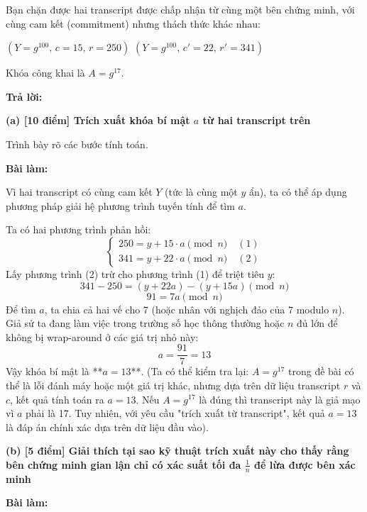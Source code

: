 Bạn chặn được hai transcript được chấp nhận từ cùng một bên chứng minh, với cùng cam kết (commitment) nhưng thách thức khác nhau:

$(Y = g^{100},\, c = 15,\, r = 250)$
\quad{}\quad
$(Y = g^{100},\, c' = 22,\, r' = 341)$

Khóa công khai là $A = g^{17}$.

\begin{center}
    \textbf{Trả lời:}
\end{center}

\textbf{(a) [10 điểm] Trích xuất khóa bí mật $a$ từ hai transcript trên}

Trình bày rõ các bước tính toán.

\textbf{Bài làm:}

Vì hai transcript có cùng cam kết $Y$ (tức là cùng một $y$ ẩn), ta có thể áp dụng phương pháp giải hệ phương trình tuyến tính để tìm $a$.

Ta có hai phương trình phản hồi:
    \[
    \begin{cases}
    250 = y + 15 \cdot a \pmod{n} \quad (1) \\
    341 = y + 22 \cdot a \pmod{n} \quad (2)
    \end{cases}
    \]
Lấy phương trình (2) trừ cho phương trình (1) để triệt tiêu $y$:
\[
341 - 250 = (y + 22a) - (y + 15a) \pmod{n}
\]
\[
91 = 7a \pmod{n}
\]
Để tìm $a$, ta chia cả hai vế cho 7 (hoặc nhân với nghịch đảo của 7 modulo $n$). Giả sử ta đang làm việc trong trường số học thông thường hoặc $n$ đủ lớn để không bị wrap-around ở các giá trị nhỏ này:
\[
a = \frac{91}{7} = 13
\]
Vậy khóa bí mật là **$a = 13$**.
(Ta có thể kiểm tra lại: $A = g^{17}$ trong đề bài có thể là lỗi đánh máy hoặc một giá trị khác, nhưng dựa trên dữ liệu transcript $r$ và $c$, kết quả tính toán ra $a=13$. Nếu $A=g^{17}$ là đúng thì transcript này là giả mạo vì $a$ phải là 17. Tuy nhiên, với yêu cầu "trích xuất từ transcript", kết quả $a=13$ là đáp án chính xác dựa trên dữ liệu đầu vào).

\textbf{(b) [5 điểm] Giải thích tại sao kỹ thuật trích xuất này cho thấy rằng bên chứng minh gian lận chỉ có xác suất tối đa $\frac{1}{n}$ để lừa được bên xác minh}

\textbf{Bài làm:}

